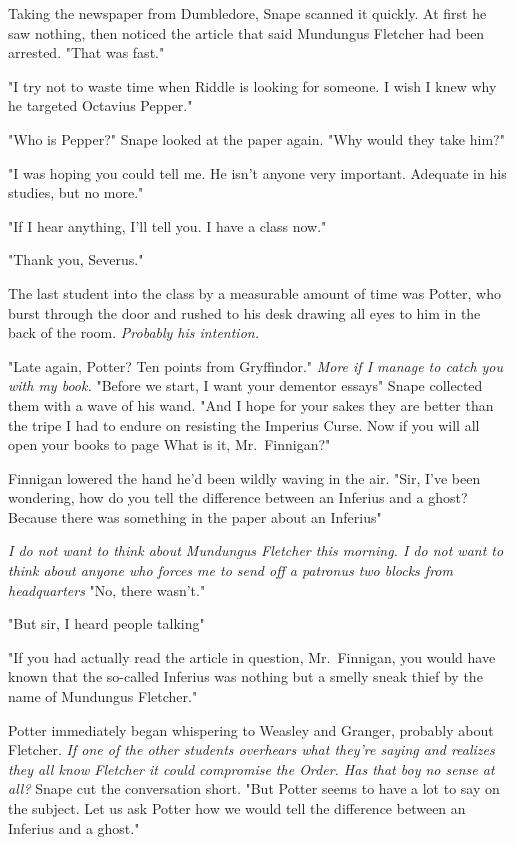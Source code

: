 Taking the newspaper from Dumbledore, Snape scanned it quickly. At first he saw nothing, then noticed the article that said Mundungus Fletcher had been arrested. "That was fast."

"I try not to waste time when Riddle is looking for someone. I wish I knew why he targeted Octavius Pepper."

"Who is Pepper?" Snape looked at the paper again. "Why would they take him?"

"I was hoping you could tell me. He isn't anyone very important. Adequate in his studies, but no more."

"If I hear anything, I'll tell you. I have a class now."

"Thank you, Severus."

The last student into the class by a measurable amount of time was Potter, who burst through the door and rushed to his desk drawing all eyes to him in the back of the room. \emph{Probably his intention.}

"Late again, Potter? Ten points from Gryffindor." \emph{More if I manage to catch you with my book.} "Before we start, I want your dementor essays{\el}" Snape collected them with a wave of his wand. "And I hope for your sakes they are better than the tripe I had to endure on resisting the Imperius Curse. Now if you will all open your books to page{\el} What is it, Mr.~Finnigan?"

Finnigan lowered the hand he'd been wildly waving in the air. "Sir, I've been wondering, how do you tell the difference between an Inferius and a ghost? Because there was something in the paper about an Inferius{\el}"

\emph{I do not want to think about Mundungus Fletcher this morning. I do not want to think about anyone who forces me to send off a patronus two blocks from headquarters{\el}} "No, there wasn't."

"But sir, I heard people talking{\el}"

"If you had actually read the article in question, Mr.~Finnigan, you would have known that the so-called Inferius was nothing but a smelly sneak thief by the name of Mundungus Fletcher."

Potter immediately began whispering to Weasley and Granger, probably about Fletcher. \emph{If one of the other students overhears what they're saying and realizes they all know Fletcher it could compromise the Order. Has that boy no sense at all?} Snape cut the conversation short. "But Potter seems to have a lot to say on the subject. Let us ask Potter how we would tell the difference between an Inferius and a ghost."

